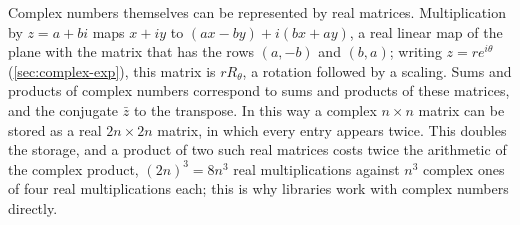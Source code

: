 \begin{table}
\end{table}

Complex numbers themselves can be represented by real matrices. Multiplication by $z=a+bi$ maps $x+iy$ to $(ax-by)+i(bx+ay)$, a real linear map of the plane with the matrix that has the rows $(a,-b)$ and $(b,a)$; writing $z=re^{i\theta}$ (\cref{sec:complex-exp}), this matrix is $rR_\theta$, a rotation followed by a scaling. Sums and products of complex numbers correspond to sums and products of these matrices, and the conjugate $\bar z$ to the transpose. In this way a complex $n\times n$ matrix can be stored as a real $2n\times2n$ matrix, in which every entry appears twice. This doubles the storage, and a product of two such real matrices costs twice the arithmetic of the complex product, $(2n)^3=8n^3$ real multiplications against $n^3$ complex ones of four real multiplications each; this is why libraries work with complex numbers directly.


